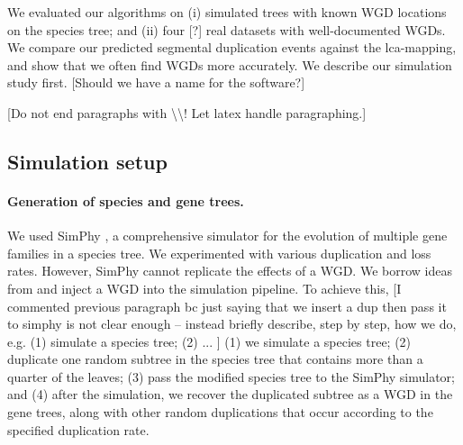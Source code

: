 \documentclass[10pt]{article}
\newcommand{\ml}[1]{\begingroup\color{blue}#1\endgroup}
\newcommand{\rk}[1]{\begingroup\color{red}#1\endgroup}
\begin{document}
We evaluated our algorithms on (i) simulated trees with known WGD locations on the species tree; and (ii) \ml{four [?]} real datasets with well-documented WGDs. 
We compare our predicted segmental duplication events against the lca-mapping, and show that we often find WGDs more accurately.  We describe our simulation study first.
\ml{[Should we have a name for the software?]}

\ml{[Do not end paragraphs with \textbackslash \textbackslash!  Let latex handle paragraphing.]}

\subsection{Simulation setup}

\paragraph{Generation of species and gene trees.}  We used SimPhy \cite{mallo2016simphy}, a comprehensive simulator for the evolution of multiple gene families in a species tree. 
We experimented with various duplication and loss rates.  However, SimPhy cannot replicate the effects of a WGD.  We borrow ideas from \cite{gorecki2024unifying} and inject a WGD into the simulation pipeline.  To achieve this, \ml{[I commented previous paragraph bc just saying that we insert a dup then pass it to simphy is not clear enough -- instead briefly describe, step by step, how we do, e.g. (1) simulate a species tree; (2) ... ]}
\rk{(1) we simulate a species tree; (2) duplicate one random subtree in the species tree that contains more than a quarter of the leaves; (3) pass the modified species tree to the SimPhy simulator; and (4) after the simulation, we recover the duplicated subtree as a WGD in the gene trees, along with other random duplications that occur according to the specified duplication rate.}
%
%
\end{document}
